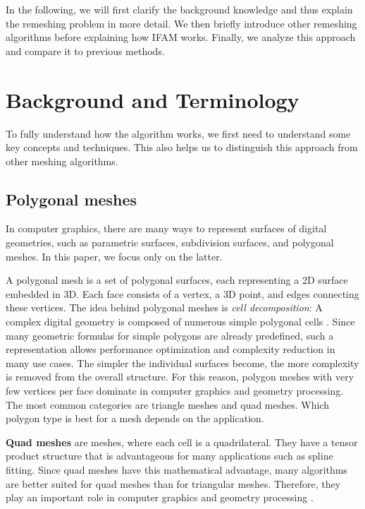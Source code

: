 \documentclass{ACGSeminar}
\begin{document}
In the following, we will first clarify the background knowledge and thus explain the remeshing problem in more detail. We then briefly introduce other remeshing algorithms before explaining how IFAM works. Finally, we analyze this approach and compare it to previous methods.

\section{Background and Terminology}
To fully understand how the algorithm works, we first need to understand some key concepts and techniques. This also helps us to distinguish this approach from other meshing algorithms.

\subsection{Polygonal meshes}
In computer graphics, there are many ways to represent surfaces of digital geometries, such as parametric surfaces, subdivision surfaces, and polygonal meshes. In this paper, we focus only on the latter.\bigskip

A polygonal mesh is a set of polygonal surfaces, each representing a 2D surface embedded in 3D. Each face consists of a vertex, a 3D point, and edges connecting these vertices. The idea behind polygonal meshes is \textit{cell decomposition}: A complex digital geometry is composed of numerous simple polygonal cells \cite{bommes2013quad}. Since many geometric formulas for simple polygons are already predefined, such a representation allows performance optimization and complexity reduction in many use cases. The simpler the individual surfaces become, the more complexity is removed from the overall structure. For this reason, polygon meshes with very few vertices per face dominate in computer graphics and geometry processing. The most common categories are triangle meshes and quad meshes. Which polygon type is best for a mesh depends on the application.\bigskip

\textbf{Quad meshes} are meshes, where each cell is a quadrilateral. They have a tensor product structure that is advantageous for many applications such as spline fitting. Since quad meshes have this mathematical advantage, many algorithms are better suited for quad meshes than for triangular meshes. Therefore, they play an important role in computer graphics and geometry processing \cite{bommes2013quad, chen2019quadrilateral}.\bigskip
\end{document}
